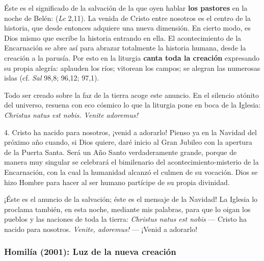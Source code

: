 \begin{body}
	Éste es el significado de la salvación de la que oyen hablar \textbf{los pastores} en la noche de Belén:  (\emph{Lc} 2,11). La venida de Cristo entre nosotros es el centro de la historia, que desde entonces adquiere una nueva dimensión. En cierto modo, es Dios mismo que escribe la historia entrando en ella. El acontecimiento de la Encarnación se abre así para abrazar totalmente la historia humana, desde la creación a la parusía. Por esto en la liturgia \textbf{canta toda la creación} expresando su propia alegría: aplauden los ríos; vitorean los campos; se alegran las numerosas islas (cf. \emph{Sal} 98,8; 96,12; 97,1).
	
	Todo ser creado sobre la faz de la tierra acoge este anuncio. En el silencio atónito del universo, resuena con eco cósmico lo que la liturgia pone en boca de la Iglesia: \emph{Christus natus est nobis. Venite adoremus!}
	
	4. Cristo ha nacido para nosotros, ¡venid a adorarlo! Pienso ya en la Navidad del próximo año cuando, si Dios quiere, daré inicio al Gran Jubileo con la apertura de la Puerta Santa. Será un Año Santo verdaderamente grande, porque de manera muy singular se celebrará el bimilenario del acontecimiento-misterio de la Encarnación, con la cual la humanidad alcanzó el culmen de su vocación. Dios se hizo Hombre para hacer al ser humano partícipe de su propia divinidad.
	
	¡Éste es el anuncio de la salvación; éste es el mensaje de la Navidad! La Iglesia lo proclama también, en esta noche, mediante mis palabras, para que lo oigan los pueblos y las naciones de toda la tierra: \emph{Christus natus est nobis} --- Cristo ha nacido para nosotros. \emph{Venite, adoremus!} --- ¡Venid a adorarlo!
\end{body}

\subsubsection{Homilía (2001): Luz de la nueva creación}


